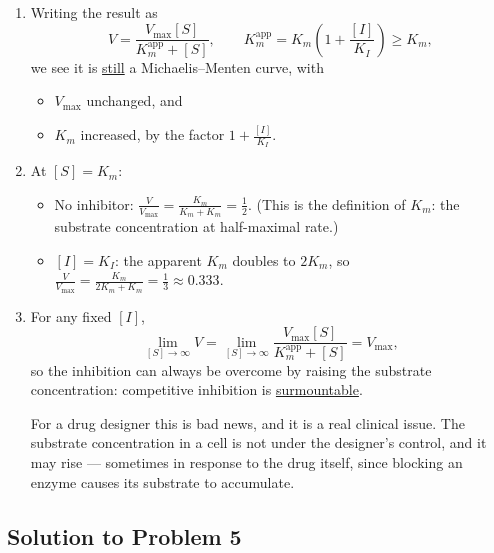 \documentclass[a4paper,12pt]{article}
\begin{document}
\begin{enumerate}[label=(\alph*)]
\item Writing the result as
\[ V = \frac{V_{\max}[S]}{K_m^{\text{app}} + [S]},
\qquad
K_m^{\text{app}} = K_m\left( 1 + \frac{[I]}{K_I} \right) \geq K_m , \]
we see it is \underline{still} a Michaelis--Menten curve, with
\begin{itemize}
\item $V_{\max}$ unchanged, and
\item $K_m$ increased, by the factor $1+\frac{[I]}{K_I}$.
\end{itemize}
%

\item At $[S]=K_m$:
\begin{itemize}
\item No inhibitor: $\displaystyle \frac{V}{V_{\max}} = \frac{K_m}{K_m+K_m} = \frac{1}{2}$. (This is the definition of $K_m$: the substrate concentration at half-maximal rate.)
\item $[I]=K_I$: the apparent $K_m$ doubles to $2K_m$, so $\displaystyle \frac{V}{V_{\max}} = \frac{K_m}{2K_m+K_m} = \frac{1}{3} \approx 0.333$.
\end{itemize}

\item For any fixed $[I]$,
\[ \lim_{[S]\to\infty} V = \lim_{[S]\to\infty} \frac{V_{\max}[S]}{K_m^{\text{app}}+[S]} = V_{\max} , \]
so the inhibition can always be overcome by raising the substrate concentration: competitive inhibition is \underline{surmountable}.

For a drug designer this is bad news, and it is a real clinical issue. The substrate concentration in a cell is not under the designer's control, and it may rise --- sometimes in response to the drug itself, since blocking an enzyme causes its substrate to accumulate.
\end{enumerate}

\subsection*{Solution to Problem 5}
\end{document}
